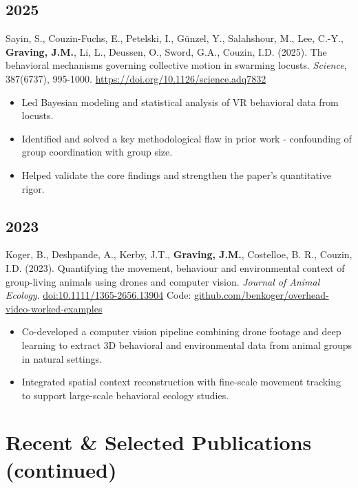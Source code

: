 \documentclass[10pt,a4paper]{article}
\begin{document}
\subsection*{2025}
Sayin, S., Couzin-Fuchs, E., Petelski, I., Günzel, Y., Salahshour, M., Lee, C.-Y., \textbf{Graving, J.M.}, Li, L., Deussen, O., Sword, G.A., Couzin, I.D. (2025). The behavioral mechanisms governing collective motion in swarming locusts. \textit{Science}, 387(6737), 995-1000. \href{https://doi.org/10.1126/science.adq7832}{https://doi.org/10.1126/science.adq7832}\par
\begin{itemize}
\item Led Bayesian modeling and statistical analysis of VR behavioral data from locusts.
\item Identified and solved a key methodological flaw in prior work - confounding of group coordination with group size.
\item Helped validate the core findings and strengthen the paper’s quantitative rigor.
\end{itemize}
\subsection*{2023}
Koger, B., Deshpande, A., Kerby, J.T., \textbf{Graving, J.M.}, Costelloe, B. R., Couzin, I.D. (2023). Quantifying the movement, behaviour and environmental context of group-living animals using drones and computer vision. \textit{Journal of Animal Ecology}. \href{https://doi.org/10.1111/1365-2656.13904}{doi:10.1111/1365-2656.13904} Code: \href{https://github.com/benkoger/overhead-video-worked-examples}{github.com/benkoger/overhead-video-worked-examples}\par
\begin{itemize}
\item Co-developed a computer vision pipeline combining drone footage and deep learning to extract 3D behavioral and environmental data from animal groups in natural settings.
\item Integrated spatial context reconstruction with fine-scale movement tracking to support large-scale behavioral ecology studies.
\end{itemize}
\newpage
\section*{Recent \& Selected Publications (continued)}
\end{document}
